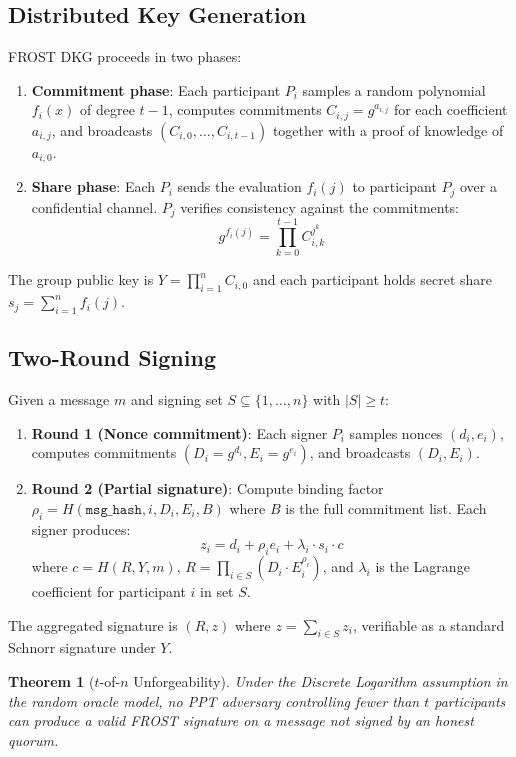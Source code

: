 \documentclass[11pt,letterpaper]{article}
\newtheorem{theorem}{Theorem}
\theoremstyle{definition}
\theoremstyle{remark}
\newcommand{\FROST}{\textsc{FROST}}
\begin{document}
\subsection{Distributed Key Generation}

\FROST{} DKG proceeds in two phases:

\begin{enumerate}
\item \textbf{Commitment phase}: Each participant $P_i$ samples a random polynomial $f_i(x)$ of degree $t-1$, computes commitments $C_{i,j} = g^{a_{i,j}}$ for each coefficient $a_{i,j}$, and broadcasts $(C_{i,0}, \ldots, C_{i,t-1})$ together with a proof of knowledge of $a_{i,0}$.
\item \textbf{Share phase}: Each $P_i$ sends the evaluation $f_i(j)$ to participant $P_j$ over a confidential channel. $P_j$ verifies consistency against the commitments:
\[
g^{f_i(j)} = \prod_{k=0}^{t-1} C_{i,k}^{j^k}
\]
\end{enumerate}

The group public key is $Y = \prod_{i=1}^{n} C_{i,0}$ and each participant holds secret share $s_j = \sum_{i=1}^{n} f_i(j)$.

\subsection{Two-Round Signing}

Given a message $m$ and signing set $S \subseteq \{1,\ldots,n\}$ with $|S| \geq t$:

\begin{enumerate}
\item \textbf{Round 1 (Nonce commitment)}: Each signer $P_i$ samples nonces $(d_i, e_i)$, computes commitments $(D_i = g^{d_i}, E_i = g^{e_i})$, and broadcasts $(D_i, E_i)$.
\item \textbf{Round 2 (Partial signature)}: Compute binding factor $\rho_i = H(\texttt{msg\_hash}, i, D_i, E_i, B)$ where $B$ is the full commitment list. Each signer produces:
\[
z_i = d_i + \rho_i e_i + \lambda_i \cdot s_i \cdot c
\]
where $c = H(R, Y, m)$, $R = \prod_{i \in S}(D_i \cdot E_i^{\rho_i})$, and $\lambda_i$ is the Lagrange coefficient for participant $i$ in set $S$.
\end{enumerate}

The aggregated signature is $(R, z)$ where $z = \sum_{i \in S} z_i$, verifiable as a standard Schnorr signature under $Y$.

\begin{theorem}[$t$-of-$n$ Unforgeability]
\label{thm:frost-security}
Under the Discrete Logarithm assumption in the random oracle model, no PPT adversary controlling fewer than $t$ participants can produce a valid \FROST{} signature on a message not signed by an honest quorum.
\end{theorem}
\end{document}
